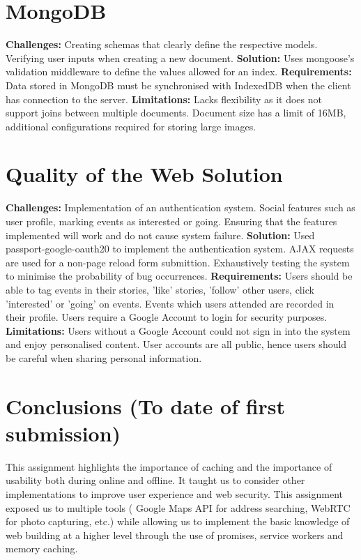 \documentclass[11pt, a4paper]{article}
\begin{document}
\section{MongoDB}
\textbf{Challenges:} Creating schemas that clearly define the respective models. Verifying user
inputs when creating a new document. \textbf{Solution:} Uses mongoose's validation middleware
\cite{validation} to define the values allowed for an index. \textbf{Requirements:} Data stored in
MongoDB must be synchronised with IndexedDB when the client has connection to the server.
\textbf{Limitations:} Lacks flexibility as it does not support joins between multiple documents.
Document size has a limit of 16MB, additional configurations required for storing large images.

\section{Quality of the Web Solution}
\textbf{Challenges:} Implementation of an authentication system. Social features such as user
profile, marking events as interested or going. Ensuring that the features implemented will work and
do not cause system failure. \textbf{Solution:} Used passport-google-oauth20 \cite{passport_google}
to implement the authentication system. AJAX requests are used for a non-page reload form
submittion. Exhaustively testing the system to minimise the probability of bug occurrences.
\textbf{Requirements:} Users should be able to tag events in their stories, 'like' stories, 'follow'
other users, click 'interested' or 'going' on events. Events which users attended are recorded in
their profile. Users require a Google Account to login for security purposes. \textbf{Limitations:}
Users without a Google Account could not sign in into the system and enjoy personalised content.
User accounts are all public, hence users should be careful when sharing personal information.

\section{Conclusions (To date of first submission)}
This assignment highlights the importance of caching and the importance of usability both during
online and offline. It taught us to consider other implementations to improve user experience and
web security. This assignment exposed us to multiple tools ( Google Maps API for address searching,
WebRTC for photo capturing, etc.) while allowing us to implement the basic knowledge of web building
at a higher level through the use of promises, service workers and memory caching.
\end{document}
